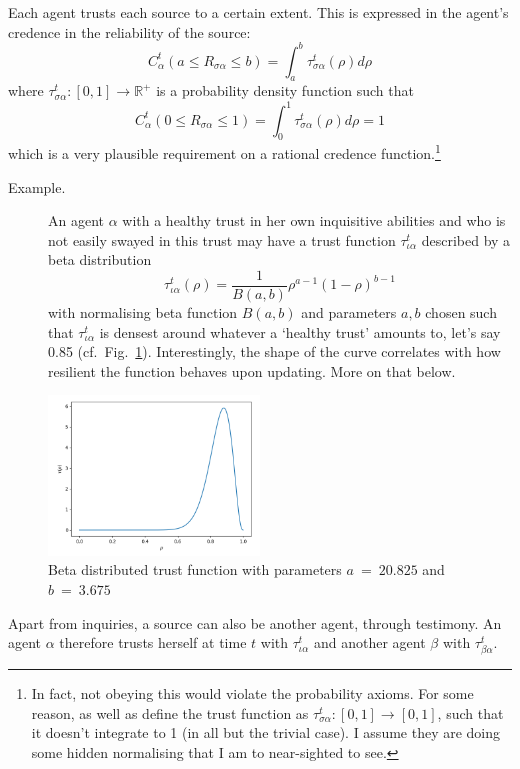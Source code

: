 \documentclass[11pt, a4paper]{scrartcl}
\newcommand{\sa}{{\sigma\alpha}}
\begin{document}
Each agent trusts each source to a certain extent. This is expressed in the agent's credence in the reliability of the source:
\[ 
    C^t_{\alpha}(a \leqslant R_{\sa} \leqslant b) = \int_a^b \tau^t_{\sa}(\rho) d\rho
\]
where $\tau^t_{\sa}: [0,1] \rightarrow \mathbb{R}^+$ is a probability density function such that 
\[
    C^t_{\alpha}(0 \leqslant R_{\sa} \leqslant 1) =  \int_0^1 \tau^t_{\sa} (\rho) d\rho = 1
\]which is a very plausible requirement on a rational credence function.\footnote{In fact, not obeying this would violate the probability axioms. For some reason, \textcite{Angere2010} as well as \textcite{Olsson2013} define the trust function as $\tau^t_{\sa}: [0,1] \rightarrow [0,1]$, such that it doesn't integrate to 1 (in all but the trivial case). I assume they are doing some hidden normalising that I am to near-sighted to see.}

\begin{description}
    \item[Example.] An agent $\alpha$ with a healthy trust in her own inquisitive abilities and who is not easily swayed in this trust may have a trust function $\tau^t_{\iota\alpha}$ described by a beta distribution
\[
    \tau^t_{\iota\alpha} (\rho) = \frac{1}{B(a,b)} \rho^{a - 1} {(1 - \rho)}^{b-1}
\]
with normalising beta function $B(a,b)$ and parameters $a, b$ chosen such that $\tau^t_{\iota\alpha}$ is densest around whatever a `healthy trust' amounts to, let's say 0.85 (cf.~Fig.~\ref{fig:trf}). Interestingly, the shape of the curve correlates with how resilient the function behaves upon updating. More on that below.
\end{description}

\begin{figure}[ht]
	\centering
    \includegraphics[width=0.5\textwidth]{Figure_1.png}
	\caption{Beta distributed trust function with parameters $a~=~20.825$ and $b~=~3.675$\label{fig:trf}}
\end{figure}

Apart from inquiries, a source can also be another agent, through testimony. An agent $\alpha$ therefore trusts herself at time $t$ with $\tau^t_{\iota\alpha}$ and another agent $\beta$ with $\tau^t_{\beta\alpha}$.
\end{document}
